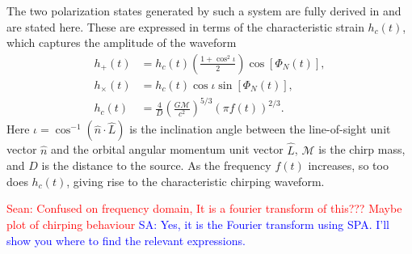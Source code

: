 \documentclass[12pt]{article}
\newcommand{\Sarp}[1]{{\textcolor{blue}{{SA: #1}} }}
\newcommand{\Sean}[1]{{\textcolor{red}{{Sean: #1}} }}
\begin{document}
The two polarization states generated by such a system are fully derived in \cite[Sec.~4.1]{GRbook} and are stated here. These are expressed in terms of the characteristic strain \( h_c(t) \), which captures the amplitude of the waveform
\begin{subequations}
\begin{align}
h_+(t) &= h_c(t) \left( \frac{1 + \cos^2\iota}{2} \right) \cos[\Phi_N(t)],
\label{eq:hp_time}\\
h_\times(t) &= h_c(t) \cos\iota \sin[\Phi_N(t)],
\label{eq:hc_time}\\
h_c(t) &= \frac{4}{D} \left( \frac{G \mathcal{M}}{c^2} \right)^{5/3} \left( \pi f(t) \right)^{2/3}
\label{eq:char_strain}.
\end{align}
\end{subequations}
Here \(\iota = \cos^{-1}(\hat{n} \cdot \hat{L}) \) is the inclination angle between the line-of-sight unit vector \( \hat{n} \) and the orbital angular momentum unit vector \( \hat{L} \),
\( \mathcal{M} \) is the chirp mass, and
\( D \) is the distance to the source.
As the frequency \( f(t) \) increases, so too does \( h_c(t) \), giving rise to the characteristic chirping waveform.

\Sean{Confused on frequency domain, It is a fourier transform of this??? Maybe plot of chirping behaviour}
\Sarp{Yes, it is the Fourier transform using SPA. I'll show you where to find the relevant expressions.}
\end{document}
